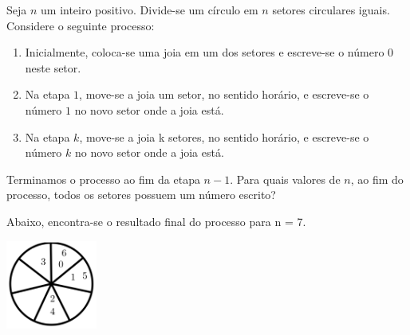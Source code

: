 Seja $n$ um inteiro positivo. Divide-se um círculo em $n$ setores circulares iguais. Considere o seguinte processo:
\begin{enumerate}[label = (\alph*)]
	\item Inicialmente, coloca-se uma joia em um dos setores e escreve-se o número 0 neste setor.
	\item Na etapa $1$, move-se a joia um setor, no sentido horário, e escreve-se o número $1$ no novo setor onde a joia está.
	\item Na etapa $k$, move-se a joia k setores, no sentido horário, e escreve-se o número $k$ no novo setor onde a joia está.
\end{enumerate}
Terminamos o processo ao fim da etapa $n - 1$. Para quais valores de $n$, ao fim do processo, todos os setores possuem um número escrito?

Abaixo, encontra-se o resultado final do processo para n = 7.

\begin{center}
	\includegraphics[width = 3cm]{fig1.png}
\end{center}
